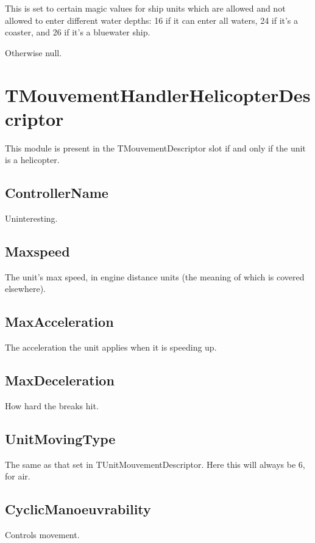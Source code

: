 \documentclass{article}
\begin{document}
This is set to certain magic values for ship units which are allowed and not allowed to enter different water depths: 16 if it can enter all waters, 24 if it's a coaster, and 26 if it's a bluewater ship.

Otherwise null.

\section{TMouvementHandlerHelicopterDescriptor}

This module is present in the TMouvementDescriptor slot if and only if the unit is a helicopter.

\subsection{ControllerName}

Uninteresting.

\subsection{Maxspeed}

The unit's max speed, in engine distance units (the meaning of which is covered elsewhere).

\subsection{MaxAcceleration}

The acceleration the unit applies when it is speeding up.

\subsection{MaxDeceleration}

How hard the breaks hit.

\subsection{UnitMovingType}

The same as that set in TUnitMouvementDescriptor. Here this will always be 6, for air.

\subsection{CyclicManoeuvrability}

Controls movement.
\end{document}
